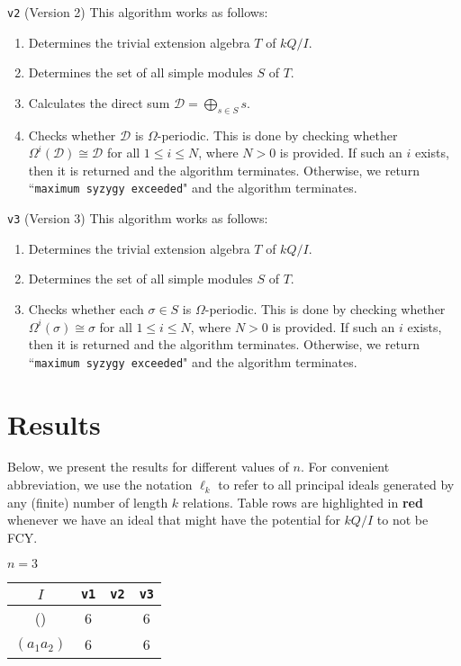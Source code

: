 \documentclass{article}
\begin{document}
\begin{flushleft}
   \begin{coolbox}{\texttt{v2} (Version 2)}
      This algorithm works as follows:
      \begin{enumerate}[label=\textbf{(\roman*)}]
         \item Determines the trivial extension algebra $T$ of $kQ/I$.
         \item Determines the set of all simple modules $S$ of $T$.
         \item Calculates the direct sum $\mathcal{D} = \displaystyle \bigoplus_{s \in S} s.$
         \item Checks whether $\mathcal{D}$ is $\Omega$-periodic. This is done by checking whether 
            $\Omega^i\left(\mathcal{D}\right) \cong \mathcal{D}$
            for all $1 \leq i \leq N$, where $N > 0$ is provided. If such an $i$ exists, then it is returned and the algorithm
            terminates. Otherwise, we return ``\texttt{maximum syzygy exceeded}" and the algorithm terminates. 
      \end{enumerate}
   \end{coolbox}

   \begin{coolbox}{\texttt{v3} (Version 3)}
      This algorithm works as follows:
      \begin{enumerate}[label=\textbf{(\roman*)}]
         \item Determines the trivial extension algebra $T$ of $kQ/I$.
         \item Determines the set of all simple modules $S$ of $T$.
         \item Checks whether each $\sigma \in S$ is $\Omega$-periodic. This is done by checking whether 
            $\Omega^i\left(\sigma \right) \cong \sigma$
            for all $1 \leq i \leq N$, where $N > 0$ is provided. If such an $i$ exists, then it is returned and the algorithm
            terminates. Otherwise, we return ``\texttt{maximum syzygy exceeded}" and the algorithm terminates. 
      \end{enumerate}
   \end{coolbox}

   \newpage

   \section{Results}
   Below, we present the results for different values of $n$. For convenient abbreviation, we use the notation $\ell_k$ to refer to all principal 
   ideals generated by any (finite) number of length $k$ relations. Table rows are highlighted in {\color{red!50!white}\textbf{red}} whenever we have an ideal
   that might have the potential for $kQ/I$ to not be FCY.
   \begin{center}
      $n=3$
      \begin{longtable}{|c|c|c|c|}
         \hline
         $I$ & \texttt{v1} & \texttt{v2} & \texttt{v3} \\
         \hline 
         () & 6 & & 6 \\
         \hline
         $(a_1a_2)$ & 6 & & 6\\
         \hline
      \end{longtable}


\end{center}
\end{flushleft}
\end{document}
